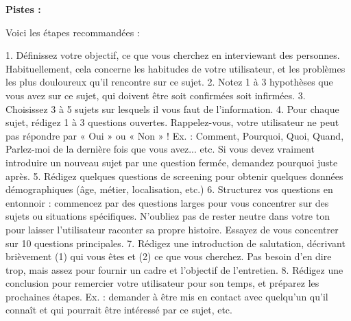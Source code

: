 \textbf{Pistes :}

Voici les étapes recommandées :

1. Définissez votre objectif, ce que vous cherchez en interviewant des personnes. Habituellement, cela concerne les habitudes de votre utilisateur, et les problèmes les plus douloureux qu'il rencontre sur ce sujet.
2. Notez 1 à 3 hypothèses que vous avez sur ce sujet, qui doivent être soit confirmées soit infirmées.
3. Choisissez 3 à 5 sujets sur lesquels il vous faut de l'information.
4. Pour chaque sujet, rédigez 1 à 3 questions ouvertes. Rappelez-vous, votre utilisateur ne peut pas répondre par « Oui » ou « Non » ! Ex. : Comment, Pourquoi, Quoi, Quand, Parlez-moi de la dernière fois que vous avez... etc. Si vous devez vraiment introduire un nouveau sujet par une question fermée, demandez pourquoi juste après.
5. Rédigez quelques questions de screening pour obtenir quelques données démographiques (âge, métier, localisation, etc.)
6. Structurez vos questions en entonnoir : commencez par des questions larges pour vous concentrer sur des sujets ou situations spécifiques. N'oubliez pas de rester neutre dans votre ton pour laisser l'utilisateur raconter sa propre histoire. Essayez de vous concentrer sur 10 questions principales.
7. Rédigez une introduction de salutation, décrivant brièvement (1) qui vous êtes et (2) ce que vous cherchez. Pas besoin d'en dire trop, mais assez pour fournir un cadre et l'objectif de l'entretien.
8. Rédigez une conclusion pour remercier votre utilisateur pour son temps, et préparez les prochaines étapes. Ex. : demander à être mis en contact avec quelqu'un qu'il connaît et qui pourrait être intéressé par ce sujet, etc.

